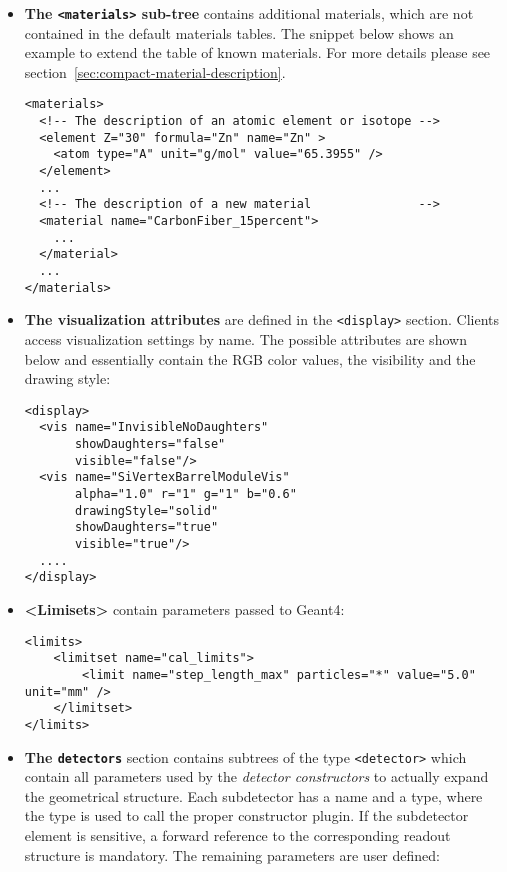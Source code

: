 \begin{itemize}
\item  {\textbf{The \texttt{<materials>} sub-tree}} contains additional materials, which are not contained in the default materials tables. The snippet below shows an example to extend the table of known materials. For more details please see section~\ref{sec:compact-material-description}.
\begin{verbatim}
<materials>
  <!-- The description of an atomic element or isotope -->
  <element Z="30" formula="Zn" name="Zn" >
    <atom type="A" unit="g/mol" value="65.3955" />
  </element>
  ...
  <!-- The description of a new material               -->
  <material name="CarbonFiber_15percent">
    ...
  </material>
  ...
</materials>
\end{verbatim}

\item {\textbf{The visualization attributes}} are defined in the \texttt{<display>} section. Clients access visualization settings by name. The possible attributes are shown below and essentially contain the RGB color values, the visibility and the drawing style:
\begin{verbatim}
<display>
  <vis name="InvisibleNoDaughters"      
       showDaughters="false" 
       visible="false"/>
  <vis name="SiVertexBarrelModuleVis" 
       alpha="1.0" r="1" g="1" b="0.6" 
       drawingStyle="solid" 
       showDaughters="true" 
       visible="true"/>
  ....
</display>
\end{verbatim}

\item {\textbf{<Limisets>}} contain parameters passed to Geant4:
\begin{verbatim}
<limits>
    <limitset name="cal_limits">
        <limit name="step_length_max" particles="*" value="5.0" unit="mm" />
    </limitset>
</limits>
\end{verbatim}

\item {\textbf{The \texttt{detectors}}} section contains subtrees of the type \texttt{<detector>} which contain all parameters used by the \textit{detector constructors} to actually expand the geometrical structure. Each subdetector has a name and a type, where the type is used to call the proper constructor plugin. If the subdetector element is sensitive, a forward reference to the corresponding readout structure is mandatory. The remaining parameters are user defined:


\end{itemize}
